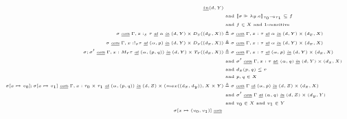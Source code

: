 \begin{definition}
\begin{equation}
\begin{tiny}
\begin{aligned}[c]
{        \underline{in} } (d, Y) \\
      & \text{ and } \llbracket \sigma \Vdash \lambda y . e \rrbracket_{\tau_0
      \multimap \tau_1} \subseteq f \\
      & \text{ and } f \in X \text{ and 1-sensitive} \\
      \sigma \textit{ \underline{com} } \Gamma, x:_s \tau \textit{ \underline{at} } \alpha \textit{ \underline{in} } (d, Y) \times D_s ((d_x, X)) &\triangleq 
      \sigma \textit{ \underline{com} } \Gamma, x : \tau \textit{ \underline{at} } \alpha \textit{ \underline{in} } (d, Y) \times (d_x, X) \\
      \sigma \textit{ \underline{com} } \Gamma, x: !_s \tau \textit{ \underline{at} } (\alpha, p) \textit{ \underline{in} } (d, Y) \times D_s ((d_x, X)) &\triangleq 
      \sigma \textit{ \underline{com} } \Gamma, x : \tau \textit{ \underline{at} } \alpha \textit{ \underline{in} } (d, Y) \times (d_x, X) \\
      \sigma; \sigma' \textit{ \underline{com} } \Gamma, x: M_r \tau \textit{ \underline{at} } (\alpha, (p, q)) \textit{ \underline{in} } (d, Y) \times T_r ((d_x, X)) &\triangleq 
      \sigma \textit{ \underline{com} } \Gamma, x : \tau \textit{ \underline{at} } (\alpha, p) \textit{ \underline{in} } (d, Y) \times (d_x, X) \\
      & \text{ and } \sigma' \textit{ \underline{com} } \Gamma, x : \tau \text{ \underline{at} } (\alpha, q) \textit{ \underline{in} } (d, Y) \times (d_x, X) \\
      & \text{ and } d_x (p, q) \leq r \\
      & \text{ and } p, q \in X \\
      \sigma[x \mapsto v_0];\sigma[x \mapsto v_1] \textit{ \underline{com} }
      \Gamma, x : \tau_0 \times \tau_1 \textit{ \underline{at} } (\alpha, (p,
      q)) \textit{ \underline{in} } (d, Z) \times (max((d_x, d_y)), X
      \times Y) &\triangleq
      \sigma \textit{ \underline{com} } \Gamma \textit{
        \underline{at} } (\alpha, p) \textit{ \underline{in} } (d, Z) \times
      (d_x, X) \\
      & \text{ and } \sigma' \textit{ \underline{com} } \Gamma \textit{
        \underline{at} } (\alpha, q) \textit{ \underline{in} } (d, Z) \times (d_y, Y)
      \\
      & \text{ and } v_0 \in X \text{ and } v_1 \in Y \\
      \sigma[x \mapsto (v_0, v_1)] \textit{ \underline{com} }

\end{aligned}
\end{tiny}
\end{equation}
\end{definition}
